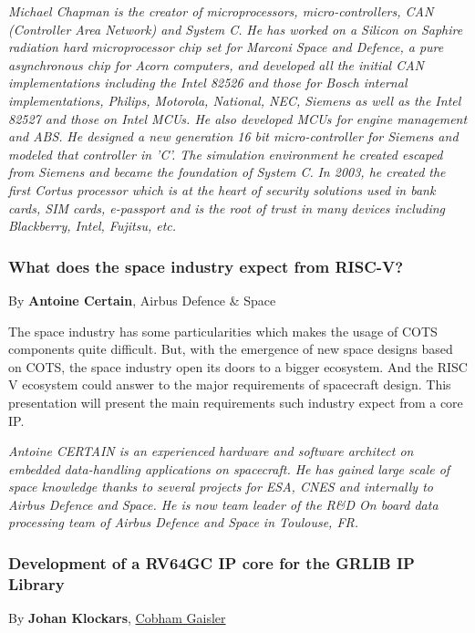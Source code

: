 \documentclass[a4paper, 10pt]{article}
\begin{document}
{\emph{\footnotesize Michael Chapman is the creator of microprocessors, micro-controllers,
CAN (Controller Area Network) and System C.}
\emph{\footnotesize He has worked on a Silicon on Saphire radiation hard microprocessor chip set for Marconi Space and Defence, a pure asynchronous chip for Acorn computers, and developed all the initial CAN implementations including the Intel 82526 and those for Bosch internal implementations, Philips, Motorola, National, NEC, Siemens as well as the Intel 82527 and those on Intel MCUs. He also developed MCUs for engine management and ABS.}
\emph{\footnotesize He designed a new generation 16 bit micro-controller for Siemens and modeled that controller in 'C'. The simulation environment he created escaped from Siemens and became the foundation of System C.}
\emph{\footnotesize In 2003, he created the first Cortus processor which is at the heart of security solutions used in bank cards, SIM cards, e-passport and is the root of trust in many devices including Blackberry, Intel, Fujitsu, etc.}
\subsubsection{What does the space industry expect from RISC-V?}
\label{sec:orgedcfbb5}
By \textbf{Antoine Certain}, Airbus Defence \& Space

The space industry has some particularities which makes the usage of
COTS components quite difficult. But, with the emergence of new space
designs based on COTS, the space industry open its doors to a bigger
ecosystem. And the RISC V ecosystem could answer to the major
requirements of spacecraft design. This presentation will present the
main requirements such industry expect from a core IP.

\emph{\footnotesize Antoine CERTAIN is an experienced hardware and software architect on embedded data-handling applications on spacecraft. He has gained large scale of space knowledge thanks to several projects for ESA, CNES and internally to Airbus Defence and Space. He is now team leader of the R\&D On board data processing team of Airbus Defence and Space in Toulouse, FR.}

\subsubsection{Development of a RV64GC IP core for the GRLIB IP Library}
\label{sec:orgd37d3f2}
By \textbf{Johan Klockars}, \href{https://www.gaisler.com}{Cobham Gaisler}

}
\end{document}
